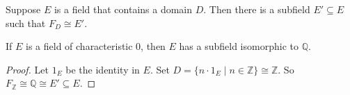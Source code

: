 \begin{theorem}
	Suppose $E$ is a field that contains a domain $D$. Then there is a subfield $E'\subseteq E$ such that $F_D\cong E'$.
\end{theorem}

\begin{corollary}
	If $E$ is a field of characteristic 0, then $E$ has a subfield isomorphic to $\mathbb Q$.
\end{corollary}

\begin{proof}
	Let $1_E$ be the identity in $E$. Set $D=\{n\cdot 1_E\mid n\in\mathbb Z\}\cong\mathbb Z$. So $F_{\mathbb Z}\cong\mathbb Q\cong E'\subseteq E$.
\end{proof}